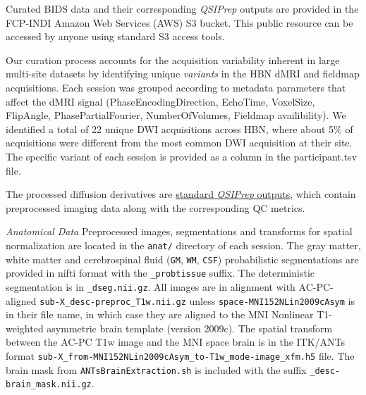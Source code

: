 \documentclass[9pt,lineno]{elife}
\begin{document}
Curated BIDS data and their corresponding \emph{QSIPrep} outputs are provided in the 
FCP-INDI Amazon Web Services (AWS) S3 bucket. This public resource can be accessed by anyone using standard S3
access tools.


Our curation process accounts for the acquisition variability inherent in large multi-site datasets
by identifying unique \emph{variants} in the HBN 
dMRI and fieldmap acquisitions. Each session was grouped according to metadata parameters that
affect the dMRI signal (PhaseEncodingDirection, EchoTime, VoxelSize, FlipAngle, PhasePartialFourier,
NumberOfVolumes, Fieldmap availibility). We identified a total of 22 unique DWI acquisitions across
HBN, where about 5\% of acquisitions were different from the most common DWI acquisition at their
site. The specific variant of each session is provided as a column in the participant.tsv file.




The processed diffusion derivatives are \href{
https://qsiprep.readthedocs.io/en/latest/preprocessing.html#outputs-of-qsiprep}{
standard \emph{QSIPrep} outputs}, which contain preprocessed imaging data
along with the corresponding QC metrics.

\emph{Anatomical Data} Preprocessed images, segmentations and transforms for spatial normalization
are located in the \texttt{anat/} directory of each session. The gray matter, white matter and 
cerebrospinal fluid (\texttt{GM}, \texttt{WM}, \texttt{CSF}) probabilistic
segmentations are provided in nifti format with the \texttt{\_probtissue} suffix. The deterministic 
segmentation is in \texttt{\_dseg.nii.gz}. All images are in alignment with AC-PC-aligned 
\texttt{sub-X\_desc-preproc\_T1w.nii.gz} unless \texttt{space-MNI152NLin2009cAsym} is in their file name,
in which case they are aligned to the MNI Nonlinear T1-weighted asymmetric brain template (version 2009c). 
The spatial transform between the AC-PC T1w image and the MNI space brain is in the ITK/ANTs format 
\texttt{sub-X\_from-MNI152NLin2009cAsym\_to-T1w\_mode-image\_xfm.h5} file. The brain mask from
\texttt{ANTsBrainExtraction.sh} is included with the suffix \texttt{\_desc-brain\_mask.nii.gz}.
\end{document}

